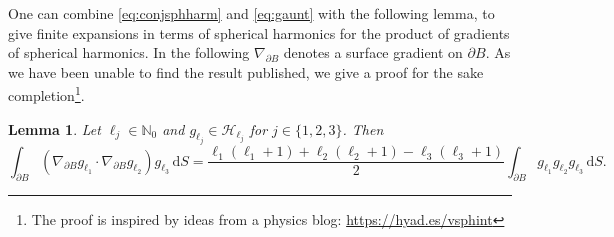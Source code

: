 \documentclass[reqno]{amsart}
\numberwithin{equation}{section}
\numberwithin{figure}{section}
\numberwithin{table}{section}
\theoremstyle{plain}
\newtheorem{lemma}[theorem]{Lemma}
\theoremstyle{definition}
\theoremstyle{remark}
\newcommand{\di}{\mathrm{d}}   %
\newcommand{\N}{\mathbb{N}}
\begin{document}
One can combine \eqref{eq:conjsphharm} and \eqref{eq:gaunt} with the following lemma, to give finite expansions in terms of spherical harmonics for the product of gradients of spherical harmonics. In the following $\nabla_{\partial B}$ denotes a surface gradient on $\partial B$. As we have been unable to find the result published, we give a proof for the sake completion\footnote{The proof is inspired by ideas from a physics blog: \url{https://hyad.es/vsphint}}.

\begin{lemma} \label{lemma:3gradient}
    Let $\ell_j\in \N_0$ and $g_{\ell_j} \in \mathcal{H}_{\ell_j}$ for $j\in\{1,2,3\}$. Then
    \begin{equation*}
        \int_{\partial B} (\nabla_{\partial B} g_{\ell_1} \cdot \nabla_{\partial B} g_{\ell_2}) g_{\ell_3} \, \di S = \frac{\ell_1 (\ell_1 + 1) + \ell_2 (\ell_2 + 1) - \ell_3 (\ell_3 + 1)}{2} \int_{\partial B} g_{\ell_1} g_{\ell_2} g_{\ell_3} \, \di S.
    \end{equation*}
\end{lemma}
%
\end{document}
